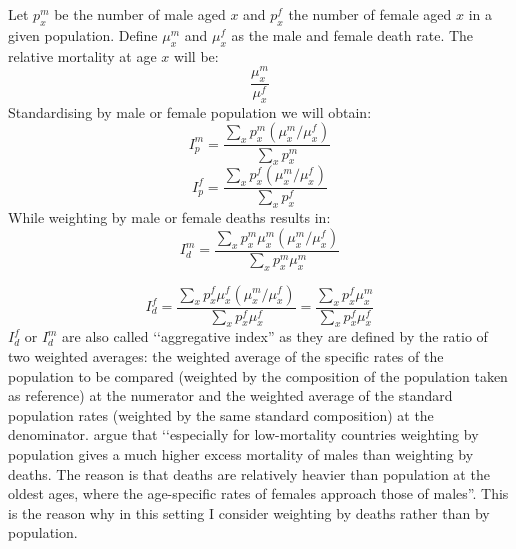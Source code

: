 \documentclass[../main.tex]{subfiles}
\begin{document}
Let $p^m_x$ be the number of male aged $x$ and $p^f_x$ the number of female aged $x$ in a given population. Define $\mu^m_x$ and $\mu^f_x$ as the male and female death rate. The relative mortality at age $x$ will be:
\begin{equation}
    \frac{\mu^m_x}{\mu^f_x}
\end{equation}
Standardising by male or female population we will obtain:
\begin{equation}
    I^m_p = \frac{\sum_{x}p^m_x (\mu^m_x / \mu^f_x)}{\sum_{x} p^m_x}
\end{equation}
\begin{equation}
    I^f_p = \frac{\sum_{x}p^f_x (\mu^m_x / \mu^f_x)}{\sum_{x} p^f_x}
\end{equation}
While weighting by male or female deaths results in:
\begin{equation}
    I^m_d = \frac{\sum_{x}p^m_x \mu^m_x (\mu^m_x / \mu^f_x)}{\sum_{x} p^m_x \mu^m_x}
\end{equation}

\begin{equation}
    I^f_d = \frac{\sum_{x}p^f_x \mu^f_x (\mu^m_x / \mu^f_x)}{\sum_{x} p^f_x \mu^f_x} = \frac{\sum_{x}p^f_x \mu^m_x}{\sum_{x} p^f_x \mu^f_x}
\end{equation}
$I^f_d$ or  $I^m_d$ are also called \lq\lq aggregative index'' as they are defined by the ratio of two weighted averages: the weighted average of the specific rates of the population to be compared (weighted by the composition of the population taken as reference) at the numerator and the weighted average of the standard population rates (weighted by the same standard composition) at the denominator.
\cite{Keyfitz2005} argue that \lq\lq especially for low-mortality countries weighting by population gives a much higher excess mortality of males than weighting by deaths. The reason is that deaths are relatively heavier than population at the oldest ages, where the age-specific rates of females approach those of males''. This is the reason why in this setting I consider weighting by deaths rather than by population.









\end{document}

